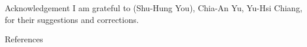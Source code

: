 \begin{frame}{Acknowledgement}
  I am grateful to  (Shu-Hung You), Chia-An Yu, Yu-Hsi Chiang,
   for their suggestions and corrections.
\end{frame}

\begin{frame}[allowframebreaks]{References}


 

\end{frame}



